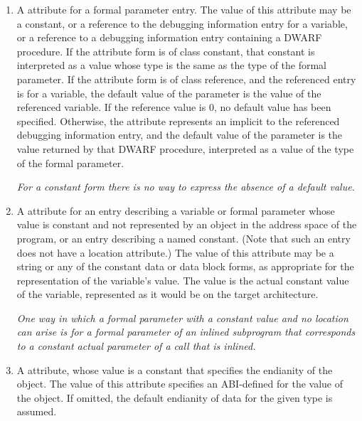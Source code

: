 \begin{enumerate}[1. ]
\item \hypertarget{chap:DWATdefaultvaluedefaultvalueofparameter}{}
A \DWATdefaultvalueDEFN{} attribute
for 
a formal parameter entry. 
The value of this attribute may be a constant, or a reference to the
debugging information entry for a variable, or a reference to a
debugging information entry containing a DWARF procedure.  If the
attribute form is of class constant, that constant is interpreted as
a value whose type is the same as 
the type of the formal parameter. If the attribute
form is of class reference, and the referenced entry is for a
variable, the default value of the parameter is the value of the
referenced variable.  If the reference value is 0, no default value
has been specified.  Otherwise, the attribute represents an implicit
\DWOPcallref{} to the referenced debugging information entry, and
the default value of the parameter is the value returned by that
DWARF procedure, interpreted as a value of the type of the formal
parameter.

\textit{For a constant form there is no way to 
express the absence of a default value.}

\item \hypertarget{chap:DWATconstvalueconstantobject}{}
A \DWATconstvalueDEFN{} attribute
for an entry describing a
variable or formal parameter whose value is constant and not
represented by an object in the address space of the program,
or an entry describing a named constant. (Note that such
an entry does not have a location attribute.) The value of
this attribute may be a string or any of the constant data
or data block forms, 
as appropriate for the representation
of the variable's value. The value is the actual constant
value of the variable, represented as it would be on the
target architecture.  

\textit{One way in which a formal parameter
with a constant value and no location can arise is for a
formal parameter of an inlined subprogram that corresponds
to a constant actual parameter of a call that is inlined.}

\item \hypertarget{chap:DWATendianityendianityofdata}{}
A \DWATendianityDEFN{} attribute,
whose value is a constant that 
specifies the endianity of the object. The value of
this attribute specifies an ABI-defined 
  for
the value of the object. If omitted, the default endianity
of data for the given type is assumed.  


\end{enumerate}
